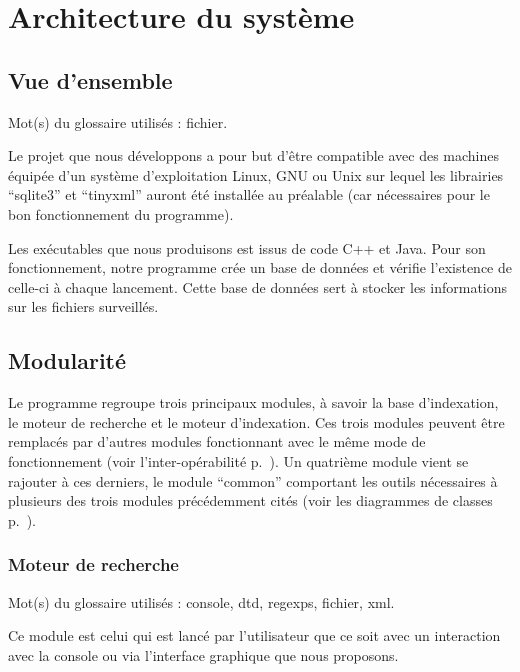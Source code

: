 \chapter{Architecture du système}

\section{Vue d'ensemble}
Mot(s) du glossaire utilisés : \gls{fichier}.

Le projet que nous développons a pour but d'être compatible avec des machines équipée d'un système d'exploitation Linux, GNU ou Unix sur lequel les librairies \enquote{sqlite3} et \enquote{tinyxml} auront été installée au préalable (car nécessaires pour le bon fonctionnement du programme).

Les exécutables que nous produisons est issus de code C++ et Java.
Pour son fonctionnement, notre programme crée un base de données et vérifie l'existence de celle-ci à chaque lancement. Cette base de données sert à stocker les informations sur les fichiers surveillés.

\section{Modularité}
Le programme regroupe trois principaux modules, à savoir la base d'indexation, le moteur de recherche  et le moteur d'indexation. Ces trois modules peuvent être remplacés par d'autres modules fonctionnant avec le même mode de fonctionnement (voir l'inter-opérabilité p.~\pageref{inter_operabilite}). Un quatrième module vient se rajouter à ces derniers, le module \enquote{common} comportant les outils nécessaires à plusieurs des trois modules précédemment cités (voir les diagrammes de classes p.~\pageref{common}).

\subsection{Moteur de recherche}
Mot(s) du glossaire utilisés : \gls{console}, \gls{dtd}, \glspl{regexp}, \gls{fichier}, \gls{xml}.

Ce module est celui qui est lancé par l'utilisateur que ce soit avec un interaction avec la console ou via l'interface graphique que nous proposons.

